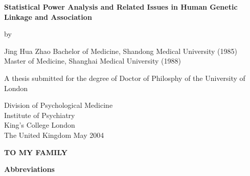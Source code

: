 \documentclass[11pt,a4paper]{iopthsis}
\begin{document}
\thispagestyle{empty}
\vskip 8cm
\begin{center}
{
\Large\bf
Statistical Power Analysis and Related Issues
in Human Genetic Linkage and Association
}

\vskip 2cm

{\large by}

\vskip 1cm

{
\Large
Jing Hua Zhao
}
\large\vskip 0.5cm
Bachelor of Medicine, Shandong Medical University (1985)\\
Master of Medicine, Shanghai Medical University (1988)\\

\vskip 1cm

{\large
A thesis submitted for the degree of Doctor of Philosphy of the University of
London}

\vskip 4.5cm

{
\Large
Division of Psychological Medicine\\
Institute of Psychiatry\\
King's College London\\ \vskip 0.3cm
The United Kingdom
\vskip 1cm
{\large May 2004}
}
\end{center}

\newpage
\topmargin=2in
\thispagestyle{empty}
\begin{center}
{\bf\Large TO MY FAMILY}
\end{center}

\newpage
\topmargin=0in

\renewcommand\contentsname{Table of Contents}
\setcounter{page}{0}
\tableofcontents
\listoftables
\listoffigures
\newpage
\pagestyle{plain}
{\bf\huge Abbreviations}
\end{document}
